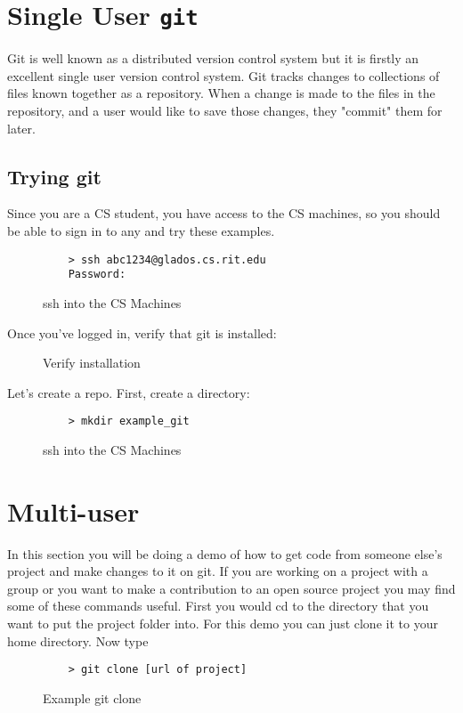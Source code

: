 \documentclass[11pt]{report}
\begin{document}
\chapter{Single User \texttt{git}}
Git is well known as a distributed version control system but it is
firstly an excellent single user version control system. 
Git tracks changes to collections of files known together as a repository.
When a change is made to the files in the repository, and a user would like
to save those changes, they "commit" them for later.

\section{Trying git}
Since you are a CS student,
you have access to the CS machines, so you should be able to sign in to any and
try these examples.

\begin{figure}[H]
  \caption{ssh into the CS Machines}
  \begin{lstlisting}
    > ssh abc1234@glados.cs.rit.edu
    Password:
  \end{lstlisting}
\end{figure}

Once you've logged in, verify that git is installed:

\begin{figure}[H]\end{figure}
\begin{figure}[H]\caption{Verify installation}\end{figure}

Let's create a repo. First, create a directory:
\begin{figure}[H]
  \caption{ssh into the CS Machines}
  \begin{lstlisting}
    > mkdir example_git
  \end{lstlisting}
\end{figure}



\chapter{Multi-user}
In this section you will be doing a demo of how to get code from
someone else's project and make changes to it on git. If you are
working on a project with a group or you want to make a contribution
to an open source project you may find some of these commands useful.
First you would cd to the directory that you want to put the project
folder into.  For this demo you can just clone it to your home
directory.  Now type
\begin{figure}[H]
  \caption{Example git clone}
  \begin{lstlisting}
    > git clone [url of project]
  \end{lstlisting}
\end{figure}
\end{document}
